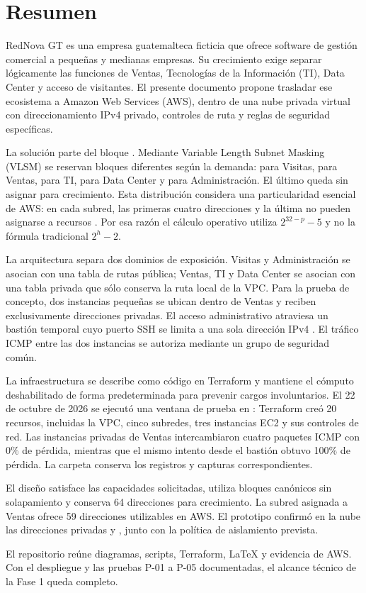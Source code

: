 \chapter{Resumen}

RedNova GT es una empresa guatemalteca ficticia que ofrece software de gestión comercial a pequeñas y medianas empresas. Su crecimiento exige separar lógicamente las funciones de Ventas, Tecnologías de la Información (TI), Data Center y acceso de visitantes. El presente documento propone trasladar ese ecosistema a Amazon Web Services (AWS), dentro de una nube privada virtual con direccionamiento IPv4 privado, controles de ruta y reglas de seguridad específicas.

La solución parte del bloque . Mediante Variable Length Subnet Masking (VLSM) se reservan bloques diferentes según la demanda:  para Visitas,  para Ventas,  para TI,  para Data Center y  para Administración. El último  queda sin asignar para crecimiento. Esta distribución considera una particularidad esencial de AWS: en cada subred, las primeras cuatro direcciones y la última no pueden asignarse a recursos \cite{aws-subnet-sizing}. Por esa razón el cálculo operativo utiliza $2^{32-p}-5$ y no la fórmula tradicional $2^h-2$.

La arquitectura separa dos dominios de exposición. Visitas y Administración se asocian con una tabla de rutas pública; Ventas, TI y Data Center se asocian con una tabla privada que sólo conserva la ruta local de la VPC. Para la prueba de concepto, dos instancias pequeñas se ubican dentro de Ventas y reciben exclusivamente direcciones privadas. El acceso administrativo atraviesa un bastión temporal cuyo puerto SSH se limita a una sola dirección IPv4 . El tráfico ICMP entre las dos instancias se autoriza mediante un grupo de seguridad común.

La infraestructura se describe como código en Terraform y mantiene el cómputo deshabilitado de forma predeterminada para prevenir cargos involuntarios. El 22 de octubre de 2026 se ejecutó una ventana de prueba en : Terraform creó 20 recursos, incluidas la VPC, cinco subredes, tres instancias EC2 y sus controles de red. Las instancias privadas de Ventas intercambiaron cuatro paquetes ICMP con 0\% de pérdida, mientras que el mismo intento desde el bastión obtuvo 100\% de pérdida. La carpeta  conserva los registros y capturas correspondientes.

\begin{infobox}
El diseño satisface las capacidades solicitadas, utiliza bloques canónicos sin solapamiento y conserva 64 direcciones para crecimiento. La subred  asignada a Ventas ofrece 59 direcciones utilizables en AWS. El prototipo confirmó en la nube las direcciones privadas  y , junto con la política de aislamiento prevista.
\end{infobox}

El repositorio reúne diagramas, scripts, Terraform, LaTeX y evidencia de AWS. Con el despliegue y las pruebas P-01 a P-05 documentadas, el alcance técnico de la Fase 1 queda completo.
